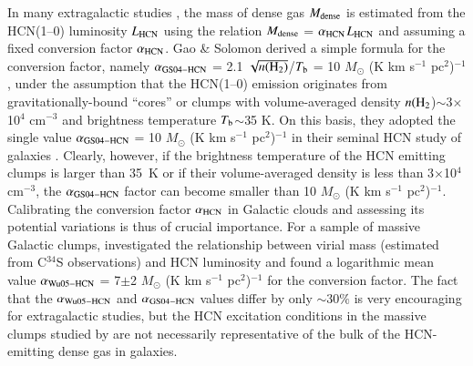 \documentclass{aa}
\begin{document}
{In many extragalactic studies \citep[e.g.][]{Gao04b}, the mass of dense gas $M_{\rm dense}$ is estimated from the HCN(1--0) luminosity 
$L_{\rm HCN}$ using the relation $M_{\rm dense}$ = $\alpha_{\rm HCN}$$L_{\rm HCN}$
and assuming a fixed conversion factor $\alpha_{\rm HCN}$. 
Gao \& Solomon derived a simple formula for the conversion factor, namely 
$\alpha_{\rm GS04-HCN}$ = 2.1 $\sqrt{n({\rm H_2})}$/$T_{\rm b}$ = 10 $M_{\odot}$ (K km s$^{-1}$ pc$^2$)$^{-1}$, 
under the assumption that the HCN(1--0) emission originates from gravitationally-bound ``cores'' or clumps with  
volume-averaged density $n({\rm H_2}$)$\sim$3$\times$10$^4$ cm$^{-3}$ and brightness temperature $T_{\rm b}$$\sim$35 K. 
On this basis, they adopted the single value $\alpha_{\rm GS04-HCN}$ = 10 $M_{\odot}$ (K km s$^{-1}$ pc$^2$)$^{-1}$ 
in their seminal HCN study of galaxies \citep[][]{Gao04b}.
Clearly, however, if the brightness temperature of the HCN emitting clumps is larger than 35~K or if their volume-averaged density
is less than 3$\times$10$^4$ cm$^{-3}$, the $\alpha_{\rm GS04-HCN}$ factor can become smaller than 10 $M_{\odot}$ (K km s$^{-1}$ pc$^2$)$^{-1}$. 
Calibrating the conversion factor $\alpha_{\rm HCN}$ in Galactic clouds and assessing its potential variations is thus of crucial importance.
For a sample of massive Galactic clumps, \citet{Wu05} investigated the relationship between virial mass (estimated from C$^{34}$S observations)
and HCN luminosity 
and found a logarithmic mean value $\alpha_{\rm Wu05-HCN}$ = 7$\pm$2 $M_{\odot}$ (K km s$^{-1}$ pc$^2$)$^{-1}$ for the 
conversion factor. The fact that the $\alpha_{\rm Wu05-HCN}$ and $\alpha_{\rm GS04-HCN}$ values differ by only $\sim 30\%$ 
is very encouraging for extragalactic studies, but the HCN excitation conditions in the massive clumps studied by \citet{Wu05} 
are not necessarily representative of the bulk of the HCN-emitting dense gas in galaxies.

}
\end{document}
